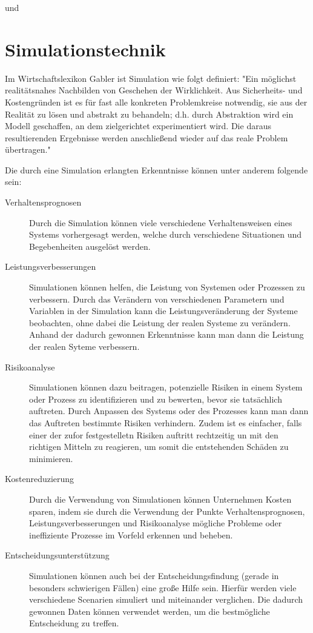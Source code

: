 \cite[vgl. ]{8310200} und \cite{6907054}



\section{Simulationstechnik} \label{simulationstechnik:section}
Im Wirtschaftslexikon Gabler ist Simulation wie folgt definiert: "Ein möglichst realitätsnahes Nachbilden von Geschehen der Wirklichkeit. Aus Sicherheits- und Kostengründen ist es für fast alle konkreten Problemkreise notwendig, sie aus der Realität zu lösen und abstrakt zu behandeln; d.h. durch Abstraktion wird ein Modell geschaffen, an dem zielgerichtet experimentiert wird. Die daraus resultierenden Ergebnisse werden anschließend wieder auf das reale Problem übertragen." \cite{Simulation}

Die durch eine Simulation erlangten Erkenntnisse können unter anderem folgende sein:
\begin{description}
    \item[Verhaltensprognosen] Durch die Simulation können viele verschiedene Verhaltensweisen eines Systems vorhergesagt werden, welche durch verschiedene Situationen und Begebenheiten ausgelöst werden.
    
    \item[Leistungsverbesserungen] Simulationen können helfen, die Leistung von Systemen oder Prozessen zu verbessern. Durch das Verändern von verschiedenen Parametern und Variablen in der Simulation kann die Leistungsveränderung der Systeme beobachten, ohne dabei die Leistung der realen Systeme zu verändern. Anhand der dadurch gewonnen Erkenntnisse kann man dann die Leistung der realen Syteme verbessern.
    
    \item[Risikoanalyse] Simulationen können dazu beitragen, potenzielle Risiken in einem System oder Prozess zu identifizieren und zu bewerten, bevor sie tatsächlich auftreten. Durch Anpassen des Systems oder des Prozesses kann man dann das Auftreten bestimmte Risiken verhindern. Zudem ist es einfacher, falls einer der zufor festgestelletn Risiken auftritt rechtzeitig un mit den richtigen Mitteln zu reagieren, um somit die entstehenden Schäden zu minimieren.
    
    \item[Kostenreduzierung] Durch die Verwendung von Simulationen können Unternehmen Kosten sparen, indem sie durch die Verwendung der Punkte Verhaltensprognosen, Leistungsverbesserungen und Risikoanalyse mögliche Probleme oder ineffiziente Prozesse im Vorfeld erkennen und beheben.
    
    \item[Entscheidungsunterstützung] Simulationen können auch bei der Entscheidungsfindung (gerade in besonders schwierigen Fällen) eine große Hilfe sein. Hierfür werden viele verschiedene Scenarien simuliert und miteinander verglichen. Die dadurch gewonnen Daten können verwendet werden, um die bestmögliche Entscheidung zu treffen.
\end{description}


